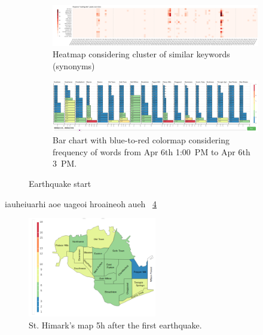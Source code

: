 \begin{figure}[!h]
    \centering
    \begin{subfigure}[!h]{0.95\textwidth}
        \centering
        \includegraphics[width=1.00\textwidth]{figs/eq_start_heat.png}
        \caption{Heatmap considering cluster of similar keywords (synonyms)}
        \label{fig:eq_start_heat}
    \vspace{12pt}
    \end{subfigure}
    \begin{subfigure}[!h]{0.95\textwidth}
        \centering
        \includegraphics[width=1.00\textwidth]{figs/eq_start_hbar.png}
        \caption{Bar chart with blue-to-red colormap considering frequency of
        words from Apr 6th 1:00~PM to Apr 6th 3~PM.}
        \label{fig:eq_start_hbar}
    \end{subfigure}
    \caption{Earthquake start}
    \label{fig:eq_start}
\end{figure}

iauheiuarhi aoe uageoi hroaineoh aueh ~\ref{fig:map_5h}

\begin{figure}[!h]
    \centering
    \includegraphics[width=0.50\textwidth]{figs/cond_5h/cond_5h_svg.png}
    \caption{St. Himark's map 5h after the first earthquake.}
    \label{fig:map_5h}
\end{figure}

